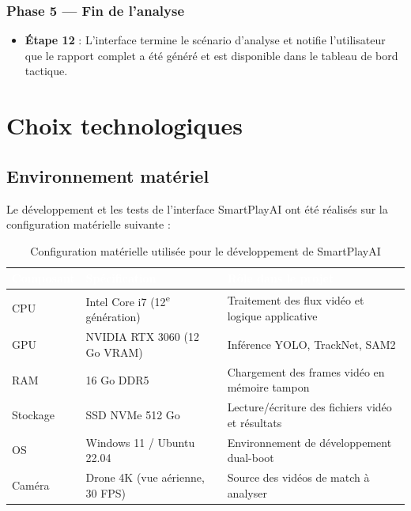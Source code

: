 \subsubsection*{Phase 5 — Fin de l'analyse}
\begin{itemize}[leftmargin=1.5em]
  \item \textbf{Étape 12} : L'interface termine le scénario d'analyse et notifie l'utilisateur
        que le rapport complet a été généré et est disponible dans le tableau de bord tactique.
\end{itemize}
 
\section{Choix technologiques}
 
\subsection{Environnement matériel}
 
Le développement et les tests de l'interface SmartPlayAI ont été réalisés sur la configuration
matérielle suivante :
 
\begin{table}[H]
  \centering
  \tablestyle
  \begin{tabularx}{\textwidth}{L{3cm} L{4.5cm} X}
    \toprule
    \textcolor{white}{\textbf{Composant}} & \textcolor{white}{\textbf{Spécification}} & \textcolor{white}{\textbf{Rôle dans le projet}} \\
    \midrule
    CPU & Intel Core i7 (12\textsuperscript{e} génération) & Traitement des flux vidéo et logique applicative \\
    GPU & NVIDIA RTX 3060 (12 Go VRAM) & Inférence YOLO, TrackNet, SAM2 \\
    RAM & 16 Go DDR5 & Chargement des frames vidéo en mémoire tampon \\
    Stockage & SSD NVMe 512 Go & Lecture/écriture des fichiers vidéo et résultats \\
    OS & Windows 11 / Ubuntu 22.04 & Environnement de développement dual-boot \\
    Caméra & Drone 4K (vue aérienne, 30 FPS) & Source des vidéos de match à analyser \\
    \bottomrule
  \end{tabularx}
  \caption{Configuration matérielle utilisée pour le développement de SmartPlayAI}
  \label{tab:config_materielle}
\end{table}
 
